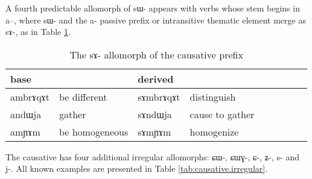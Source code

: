 \documentclass[oldfontcommands,oneside,a4paper,11pt]{article}
\newcommand{\ipa}[1]{{\phon \mbox{#1}}} %
\begin{document}
A fourth predictable allomorph of \ipa{sɯ-} appears with   verbs whose stem begins in \ipa{a--}, where \ipa{sɯ-}  and the \ipa{a-} passive prefix or intransitive thematic element merge as \ipa{sɤ-}, as in Table \ref{tab:causative.sA}.
\begin{table}[h]
\caption{The \ipa{sɤ}-   allomorph  of the causative prefix}\label{tab:causative.sA} \centering
\begin{tabular}{lllllllll} \toprule
  base & & derived & \\
 \midrule
 \ipa{ambrɤqɤt} & be different & \ipa{sɤmbrɤqɤt} & distinguish \\
\ipa{andɯja} & gather & \ipa{sɤndɯja} & cause to gather \\
 \ipa{amɲɤm} & be homogeneous & \ipa{sɤmɲɤm} & homogenize \\
 \bottomrule
\end{tabular}
\end{table}

The causative has four additional irregular allomorphs: \ipa{ɕɯ-}, \ipa{ɕɯɣ-}, \ipa{ɕ-}, \ipa{ʑ-}, \ipa{s-} and \ipa{j-}. All known examples are presented in Table \ref{tab:causative.irregular}.
\end{document}
